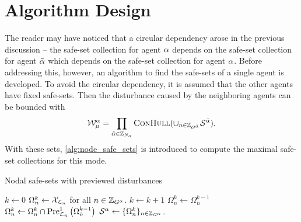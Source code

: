 \section{Algorithm Design}
The reader may have noticed that a circular dependency arose in the previous discussion -- the safe-set collection for agent $\alpha$ depends on the safe-set collection for agent ${\tilde{\alpha}}$ which depends on the safe-set collection for agent $\alpha$. Before addressing this, however, an algorithm to find the safe-sets of a single agent is developed. To avoid the circular dependency, it is assumed that the other agents have fixed safe-sets. Then the disturbance caused by the neighboring agents can be bounded with
\begin{equation}
\wcon[\agentidx][\modeidx]=\prod_{\tilde{\agentidx}\in\idxset{\numagents}}\Call{ConHull}{\cup_{n\in\idxset{\gnumnodes[\tilde{\agentidx}]}}\mathcal{S}^{\tilde{\agentidx}}}.
\end{equation}
With these sets, \autoref{alg:node_safe_sets} is introduced to compute the maximal safe-set collections for this mode. 
\begin{algorithm}[h]
\caption{Nodal safe-sets with previewed disturbances}\label{alg:node_safe_sets}
\begin{algorithmic}[1]
\State $k\gets0$
\State $\Omega_{n}^k\gets\xcon[\gnodelabel{n}]$ for all $n\in\idxset{\gnumnodes[\agentidx]}$.
\Repeat 
	\State $k\gets k+1$
		\State $\Omega_{n}^k\gets\Omega_{n}^{k-1}$
				\State $\Omega_{n}^k\gets\Omega_{n}^k\cap\PreviewedPre[\gnodelabel{\tilde{n}}][1]{\Omega_{\tilde{n}}^{k-1}}$
			\EndFor
	\EndFor
{}
\State $\safeset{}^\agentidx\gets\{\Omega_{n}^k\}_{n\in\idxset{\gnumnodes[\agentidx]}}$.\;
\EndProcedure
\end{algorithmic}
\end{algorithm}

